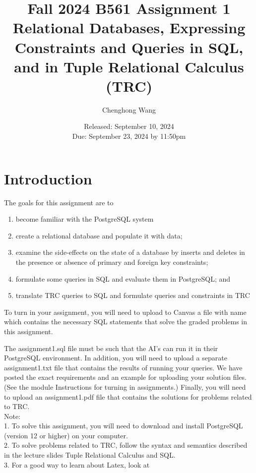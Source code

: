 \documentclass{article}
\newcommand{\blue}[1]{{\color{blue}#1}}
\begin{document}
\title{Fall 2024 B561 Assignment 1 \\
Relational Databases, Expressing Constraints and Queries in SQL, and in Tuple Relational Calculus (TRC)}
\author{Chenghong Wang }
\date{Released: September 10, 2024\\ Due: September 23, 2024 by 11:50pm}
\maketitle


\section{Introduction}

The goals for this assignment are to 
\begin{enumerate}
\item become familiar with the PostgreSQL system 

\item create a relational database and populate it with data;
\item examine the side-effects on the state of a database by inserts and deletes in the presence or absence
of primary and foreign key constraints;
\item formulate some queries in SQL and evaluate them in PostgreSQL; and
\item  translate TRC queries to SQL and formulate queries and constraints in TRC

\end{enumerate}

To turn in your assignment, you will need to upload to Canvas a file with name \blue{{\tt assignment1.sql}} 
which contains 
the necessary SQL statements that solve the graded problems in this assignment. 

The assignment1.sql file must be such that the AI’s can run it in their
PostgreSQL environment. In addition, you will need to upload a separate assignment1.txt
file that contains the results of running your queries. We have posted the exact requirements
and an example for uploading your solution files. (See the module Instructions for turning in
assignments.) Finally, you will need to upload an assignment1.pdf file that contains the
solutions for problems related to TRC.\\

Note:\\
1. To solve this assignment, you will need to download and install PostgreSQL (version
12 or higher) on your computer.\\
2. To solve problems related to TRC, follow the syntax and semantics described in the lecture slides Tuple Relational Calculus and SQL.\\
3. For a good way to learn about Latex, look at 
\end{document}
